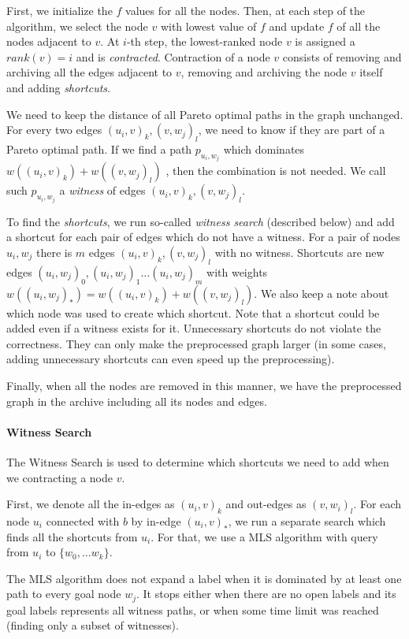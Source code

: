 First, we initialize the $f$ values for all the nodes. Then, at each step of
the algorithm, we select the node $v$ with lowest value of $f$ and update $f$
of all the nodes adjacent to $v$.  At $i$-th step, the lowest-ranked node $v$
is assigned a $rank(v) = i$ and is \emph{contracted}.  Contraction of a node
$v$ consists of removing and archiving all the edges adjacent to $v$, removing
and archiving the node $v$ itself and adding {\em shortcuts}. 

\vskip 5mm
We need to keep the distance of all Pareto optimal paths in the graph
unchanged. For every two edges $(u_i,v)_k,(v,w_j)_l$, we need to know if they
are part of a Pareto optimal path. If we find a path $p_{u_i,w_j}$ which
dominates $w((u_i,v)_k)+w((v,w_j)_l)$ , then the combination is not needed. We
call such $p_{u_i,w_j}$ a \emph{witness} of edges $(u_i,v)_k,(v,w_j)_l$. 

To find the {\em shortcuts}, we run so-called {\em witness search} (described
below) and add a shortcut for each pair of edges which do not have a witness.
For a pair of nodes $u_i, w_j$ there is $m$ edges $(u_i,v)_k,(v,w_j)_l$
with no witness. Shortcuts are new edges
$(u_i,w_j)_0, (u_i,w_j)_1 \dots (u_i,w_j)_m$ 
with weights $w((u_i,w_j)_*) = w((u_i,v)_k)+w((v,w_j)_l)$.  We also keep a note
about which node was used to create which shortcut.  Note that a shortcut could
be added even if a witness exists for it. Unnecessary shortcuts do not violate
the correctness. They can only make the preprocessed graph larger (in some
cases, adding unnecessary shortcuts can even speed up the preprocessing). 


Finally, when all the nodes are removed in this manner, we have the
preprocessed graph in the archive including all its nodes and edges.

\paragraph*{Witness Search} The Witness Search is used to determine which
shortcuts we need to add when we contracting a node $v$. 

First, we denote all the in-edges as $(u_i,v)_k$ and out-edges as $(v,w_i)_l$.
For each node $u_i$ connected with $b$ by in-edge $(u_i,v)_*$, we run a
separate search which finds all the shortcuts from $u_i$. For that, we use a
MLS algorithm with query from $u_i$ to $\{w_0,\dots w_k\}$. 

The MLS algorithm does not expand a label when it is dominated by at least one
path to every goal node $w_j$. It stops either when there are no open labels
and its goal labels represents all witness paths, or when some time limit was reached
(finding only a subset of witnesses). 


